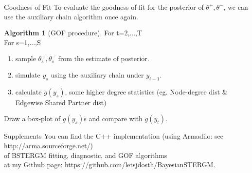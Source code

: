 \documentclass[aspectratio=169,ignorenonframetext,9pt]{beamer}
\theoremstyle{plain}
\theoremstyle{definition}
\newtheorem{algo}{Algorithm}[section]
\begin{document}
\begin{frame}{Goodness of Fit}
    To evaluate the goodness of fit for the posterior of $\theta^+,\theta^-$,
    we can use the auxiliary chain algorithm once again.
    \begin{algo}[GOF procedure]
        For t=2,...,T
        \\For s=1,...,S
        \begin{enumerate}
            \item sample $\theta_s^+,\theta_s^-$ from the estimate of posterior.
            \item simulate $y_s$ using the auxiliary chain under $y_{t-1}$.
            \item calculate $g(y_s)$, some higher degree statistics (eg. Node-degree dist \& Edgewise Shared Partner dist)
        \end{enumerate}
        Draw a box-plot of $g(y_s)$s and compare with $g(y_t)$.
    \end{algo}
\end{frame}

\begin{frame}{Supplements}
    You can find the C++ implementation (using Armadilo: see http://arma.sourceforge.net/)
    \\ of BSTERGM fitting, diagnostic, and GOF algorithms
    \\ at my Github page: https://github.com/letsjdosth/BayesianSTERGM.
\end{frame}
\end{document}
